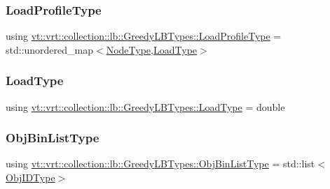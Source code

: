 \subsubsection{\texorpdfstring{Load\+Profile\+Type}{LoadProfileType}}
{\footnotesize\ttfamily using \hyperlink{structvt_1_1vrt_1_1collection_1_1lb_1_1_greedy_l_b_types_a8af324cd88e83727178631e4d1478932}{vt\+::vrt\+::collection\+::lb\+::\+Greedy\+L\+B\+Types\+::\+Load\+Profile\+Type} =  std\+::unordered\+\_\+map$<$\hyperlink{namespacevt_a866da9d0efc19c0a1ce79e9e492f47e2}{Node\+Type},\hyperlink{structvt_1_1vrt_1_1collection_1_1lb_1_1_greedy_l_b_types_a9fe8829bc0c92e88ddf9d149233a54f4}{Load\+Type}$>$}

\mbox{\label{structvt_1_1vrt_1_1collection_1_1lb_1_1_greedy_l_b_types_a9fe8829bc0c92e88ddf9d149233a54f4}} 
\subsubsection{\texorpdfstring{Load\+Type}{LoadType}}
{\footnotesize\ttfamily using \hyperlink{structvt_1_1vrt_1_1collection_1_1lb_1_1_greedy_l_b_types_a9fe8829bc0c92e88ddf9d149233a54f4}{vt\+::vrt\+::collection\+::lb\+::\+Greedy\+L\+B\+Types\+::\+Load\+Type} =  double}

\mbox{\label{structvt_1_1vrt_1_1collection_1_1lb_1_1_greedy_l_b_types_a5f1f5da7ec80da0de64a9d91624c396b}} 
\subsubsection{\texorpdfstring{Obj\+Bin\+List\+Type}{ObjBinListType}}
{\footnotesize\ttfamily using \hyperlink{structvt_1_1vrt_1_1collection_1_1lb_1_1_greedy_l_b_types_a5f1f5da7ec80da0de64a9d91624c396b}{vt\+::vrt\+::collection\+::lb\+::\+Greedy\+L\+B\+Types\+::\+Obj\+Bin\+List\+Type} =  std\+::list$<$\hyperlink{structvt_1_1vrt_1_1collection_1_1lb_1_1_greedy_l_b_types_ae22670acd689e4ff83315fac2e4acb5e}{Obj\+I\+D\+Type}$>$}

